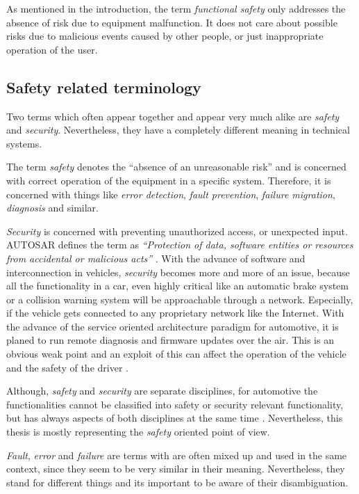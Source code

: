 As mentioned in the introduction, the term \emph{functional safety} only addresses the absence of risk due to equipment malfunction. It does not care about possible risks due to malicious events caused by other people, or just inappropriate operation of the user.


\subsection{Safety related terminology}

Two terms which often appear together and appear very much alike are \emph{safety} and \emph{security}. Nevertheless, they have a completely different meaning in technical systems.

The term \emph{safety} denotes the ``absence of an unreasonable risk'' \cite{autosar_glossary} \cite{iso26262:1} and is concerned with correct operation of the equipment in a specific system. Therefore, it is concerned with things like \emph{error detection}, \emph{fault prevention}, \emph{failure migration}, \emph{diagnosis} and similar.

\emph{Security} is concerned with preventing unauthorized access, or unexpected input. AUTOSAR defines the term as \emph{``Protection of data, software entities or resources from accidental or malicious acts''} \cite{autosar_glossary}. With the advance of software and interconnection in vehicles, \emph{security} becomes more and more of an issue, because all the functionality in a car, even highly critical like an automatic brake system or a collision warning system will be approachable through a network. Especially, if the vehicle gets connected to any proprietary network like the Internet. With the advance of the service oriented architecture paradigm for automotive, it is planed to run remote diagnosis and firmware updates over the air. This is an obvious weak point and an exploit of this can affect the operation of the vehicle and the safety of the driver \cite{nilsson2008}.

Although, \emph{safety} and \emph{security} are separate disciplines, for automotive the functionalities cannot be classified into safety or security relevant functionality, but has always aspects of both disciplines at the same time \cite{nilsson2008}. Nevertheless, this thesis is mostly representing the \emph{safety} oriented point of view.


\label{sec:fault,error,failure}
\emph{Fault}, \emph{error} and \emph{failure} are terms with are often mixed up and used in the same context, since they seem to be very similar in their meaning. Nevertheless, they stand for different things and its important to be aware of their disambiguation.


